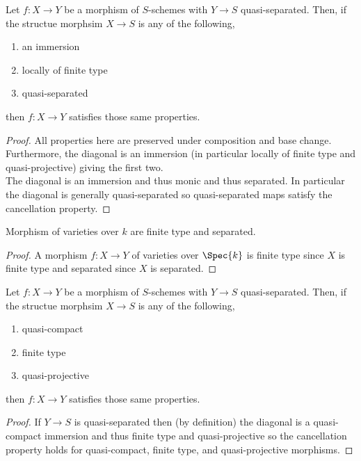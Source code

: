 \documentclass[12pt]{article}
\begin{document}
\begin{cor}
Let $f : X \to Y$ be a morphism of $S$-schemes with $Y \to S$ quasi-separated. Then, if the structue morphsim $X \to S$ is any of the following,
\begin{enumerate}
\item an immersion
\item locally of finite type
\item quasi-separated
\end{enumerate}
then $f : X \to Y$ satisfies those same properties.
\end{cor}

\begin{proof}
All properties here are preserved under composition and base change. Furthermore, the diagonal is an immersion (in particular locally of finite type and quasi-projective) giving the first two. 
\bigskip\\
The diagonal is an immersion and thus monic and thus separated. In particular the diagonal is generally quasi-separated so quasi-separated maps satisfy the cancellation property.
\end{proof}

\begin{cor}
Morphism of varieties over $k$ are finite type and separated. 
\end{cor}

\begin{proof}
A morphism $f : X \to Y$ of varieties over $\Spec{k}$ is finite type since $X$ is finite type and separated since $X$ is separated.
\end{proof}

\begin{cor}
Let $f : X \to Y$ be a morphism of $S$-schemes with $Y \to S$ quasi-separated. Then, if the structue morphsim $X \to S$ is any of the following,
\begin{enumerate}
\item quasi-compact
\item finite type
\item quasi-projective
\end{enumerate}
then $f : X \to Y$ satisfies those same properties.
\end{cor}

\begin{proof}
If $Y \to S$ is quasi-separated then (by definition) the diagonal is a quasi-compact immersion and thus finite type and quasi-projective so the cancellation property holds for quasi-compact, finite type, and quasi-projective morphisms.
\end{proof}
\end{document}
